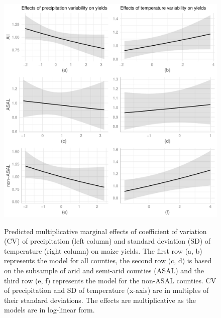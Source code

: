 \documentclass[12pt]{iopart}
\begin{document}
{  \begin{figure}
   \includegraphics{Figure2a_2f.pdf}\label{MarEff2}
\caption{Predicted multiplicative marginal effects of coefficient of variation (CV) of precipitation (left column) and standard deviation (SD) of temperature (right column) on maize yields. The first row (a, b) represents the model for all counties, the second row (c, d) is based on the subsample of arid and semi-arid counties (ASAL) and the third row (e, f) represents the model for the non-ASAL counties. CV of precipitation and SD of temperature (x-axis) are in multiples of their standard deviations. The effects are multiplicative as the models are in log-linear form.}
\end{figure}

}
\end{document}
